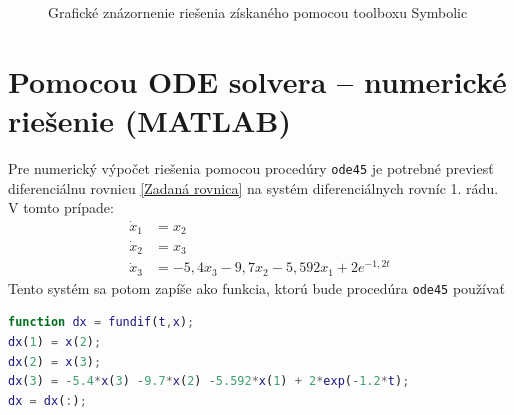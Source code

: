 \documentclass[a4paper, 10pt, ]{article}
\begin{document}
\begin{figure}[!ht]
	\centering


	\caption{Grafické znázornenie riešenia získaného pomocou toolboxu Symbolic}
	\label{Grafické znázornenie riešenia získaného Symbolic}
\end{figure}































\section{Pomocou ODE solvera -- numerické riešenie (MATLAB)}


Pre numerický výpočet riešenia pomocou procedúry \verb|ode45| je potrebné previesť diferenciálnu rovnicu \eqref{Zadaná rovnica} na systém diferenciálnych rovníc 1. rádu. V tomto prípade:
\begin{subequations}
	\begin{align}
		\dot x_1 &= x_2 \\
		\dot x_2 &= x_3 \\
		\dot x_3 &= -5,4 x_3 -9,7 x_2 -5,592 x_1 + 2 e^{-1,2 t}
	\end{align}
\end{subequations}
Tento systém sa potom zapíše ako funkcia, ktorú bude procedúra \verb|ode45| používať
\begin{lstlisting}[language=Matlab,]
function dx = fundif(t,x);
dx(1) = x(2);
dx(2) = x(3);
dx(3) = -5.4*x(3) -9.7*x(2) -5.592*x(1) + 2*exp(-1.2*t);
dx = dx(:);
\end{lstlisting}
\end{document}
